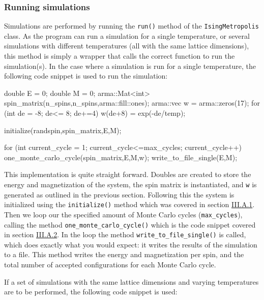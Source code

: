 \documentclass[reprint,english,notitlepage]{revtex4-1}  %
\begin{document}
\subsubsection{Running simulations} \label{sec:III:a:iii}

Simulations are performed by running the \verb+run()+ method of the \verb+IsingMetropolis+ class. As the program can run a simulation for a single temperature, or several simulations with different temperatures (all with the same lattice dimensions), this method is simply a wrapper that calls the correct function to run the simulation(s). In the case where a simulation is run for a single temperature, the following code snippet is used to run the simulation:

\begin{cpp}
double E = 0;
double M = 0;
arma::Mat<int> spin_matrix(n_spins,n_spins,arma::fill::ones);
arma::vec w = arma::zeros(17);
for (int de = -8; de<= 8; de+=4) {
  w(de+8) = exp(-de/temp);
}

initialize(randspin,spin_matrix,E,M);

for (int current_cycle = 1; current_cycle<=max_cycles; 
	 current_cycle++){
  one_monte_carlo_cycle(spin_matrix,E,M,w);
  write_to_file_single(E,M);
}
\end{cpp}

This implementation is quite straight forward. Doubles are created to store the energy and magnetization of the system, the spin matrix is instantiated, and \verb+w+ is generated as outlined in the previous section. Following this the system is initialized using the \verb+initialize()+ method which was covered in section \hyperref[sec:III:a:i]{III.A.1}. Then we loop our the specified amount of Monte Carlo cycles (\verb+max_cycles+), calling the method \verb+one_monte_carlo_cycle()+ which is the code snippet covered in section \hyperref[sec:III:a:2]{III.A.2}. In the loop the method \verb+write_to_file_single()+ is called, which does exactly what you would expect: it writes the results of the simulation to a file. This method writes the energy and magnetization per spin, and the total number of accepted configurations for each Monte Carlo cycle. 

If a set of simulations with the same lattice dimensions and varying temperatures are to be performed, the following code snippet is used:
\end{document}
